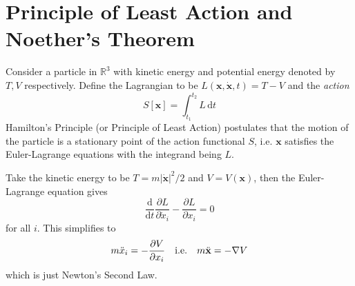 \documentclass[a4paper]{article}
\begin{document}
\section{Principle of Least Action and Noether's Theorem}
Consider a particle in $\mathbb R^3$ with kinetic energy and potential energy denoted by $T,V$ respectively.
Define the Lagrangian to be $L(\mathbf{x},\mathbf{\dot{x}},t)=T-V$ and the \textit{action}
$$S[\mathbf{x}]=\int_{t_1}^{t_2}L\,\mathrm dt$$
Hamilton's Principle (or Principle of Least Action) postulates that the motion of the particle is a stationary point of the action functional $S$, i.e. $\mathbf{x}$ satisfies the Euler-Lagrange equations with the integrand being $L$.
\begin{example}
    Take the kinetic energy to be $T=m|\mathbf{\dot{x}}|^2/2$ and $V=V(\mathbf{x})$, then the Euler-Lagrange equation gives
    $$\frac{\mathrm d}{\mathrm dt}\frac{\partial L}{\partial \dot{x}_i}-\frac{\partial L}{\partial x_i}=0$$
    for all $i$.
    This simplifies to
    $$m\ddot{x}_i=-\frac{\partial V}{\partial x_i}\quad \text{i.e.}\quad m \ddot{{\bf x}}= - \nabla V$$
    which is just Newton's Second Law.
\end{example}
\newpage
\end{document}
